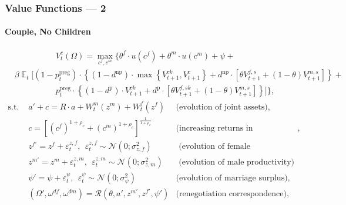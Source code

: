 \documentclass{beamer}
\DeclareMathOperator{\E}{\mathbb{E}}
\begin{document}
\begin{frame}[label=value-functions]
\frametitle{Value Functions --- 2}
\framesubtitle{Couple, No Children}
{\scriptsize
\begin{align}& \hspace{5em}  V^{c}_t(\Omega) = \max\limits_{c^f,c^m}  \bigg\{ \theta^f \cdot u(c^f) + \theta^m \cdot u(c^m) + \psi + \nonumber \\   \nonumber
 &  \beta \E_t \Big[   (1 - p^{\text{preg}}_t)\cdot \left\{ (1-d^{\text{np}})\cdot \max\left\{ V^{ck}_{t+1},V^{c}_{t+1}\right\} + d^{\text{np}}\cdot [ \theta V_{t+1}^{f,s} + (1-\theta)V_{t+1}^{m,s}]\right\}  +  \\  \nonumber
& \hspace{5em} p^{\text{preg}}_t\cdot \left\{ (1-d^{\text{p}})\cdot V^{ck}_{t+1} + d^{\text{p}}\cdot [ \theta V_{t+1}^{f,sk} + (1-\theta)V_{t+1}^{m,s}]\right\} \Big] \bigg\},
\end{align}\vspace{-2em}
\begin{align*}
\text{s.t. \ }& a' + c = R\cdot a  + W^m_t(z^m) + W^f_t(z^f) & \text{(evolution of joint assets)},\\
				 & c = [(c^f)^{1+\rho_c} + (c^m)^{1+\rho_c}]^{\frac1{1+\rho_c}} & \text{(increasing returns in consumption)},\\
				 &  z^{f\prime} = z^f + \varepsilon^{z,f}_t, \ \ \varepsilon^{z,f}_t \sim \mathcal{N}(0;\sigma_{z,f}^2) &  \text{ (evolution of female productivity)}\\
				 &  z^{m\prime} = z^m + \varepsilon^{z,m}_t, \ \ \varepsilon^{z,m}_t \sim \mathcal{N}(0;\sigma_{z,m}^2) &  \text{ (evolution of male productivity)}\\
                    & \psi' = \psi + \varepsilon^{\psi}_t, \ \ \varepsilon^{\psi}_t \sim \mathcal{N}(0;\sigma_{\psi}^2)  & \text{(evolution of marriage surplus),} \\
                    & (\Omega',\omega^{df},\omega^{dm}) = \mathcal{R}(\theta,a',z^{m\prime},z^{f\prime},\psi') & \text{(renegotiation correspondence)},
\end{align*}
}
\hyperlink{utilities}{}
\end{frame}
\end{document}
